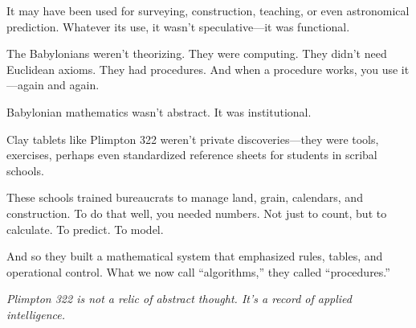 It may have been used for surveying, construction, teaching, or even astronomical prediction.  
Whatever its use, it wasn't speculative—it was functional.

The Babylonians weren’t theorizing. They were computing.  
They didn’t need Euclidean axioms. They had procedures.  
And when a procedure works, you use it—again and again.

\begin{tcolorbox}[title=Historical Sidebar: Scribes and Systems, colback=gray!5, colframe=black, fonttitle=\bfseries]

  Babylonian mathematics wasn’t abstract. It was institutional.

  Clay tablets like Plimpton 322 weren’t private discoveries—they were tools, exercises, perhaps even standardized reference sheets for students in scribal schools.

  These schools trained bureaucrats to manage land, grain, calendars, and construction.  
  To do that well, you needed numbers. Not just to count, but to calculate. To predict. To model.

  And so they built a mathematical system that emphasized rules, tables, and operational control.  
  What we now call “algorithms,” they called “procedures.”

\end{tcolorbox}

\vspace{1em}

\begin{center}
\textit{Plimpton 322 is not a relic of abstract thought.  
It’s a record of applied intelligence.}
\end{center}
